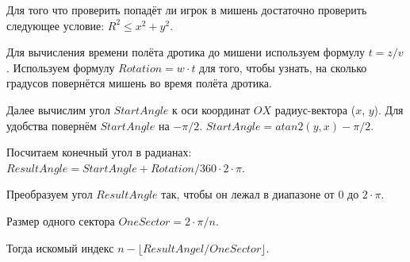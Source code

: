 \solutionSection

Для того что проверить попадёт ли игрок в мишень достаточно проверить следующее условие: $R^2 \le x^2 + y^2$.

Для вычисления времени полёта дротика до мишени используем формулу $t = z / v$. Используем формулу $Rotation = w \cdot t$ для того, чтобы узнать, на сколько градусов повернётся мишень во время полёта дротика.

Далее вычислим угол $StartAngle$ к оси координат $OX$  радиус-вектора ($x$, $y$). Для удобства повернём $StartAngle$ на $-\pi/2$. $StartAngle = atan2(y, x) - \pi/2$.

Посчитаем конечный угол в радианах: $ResultAngle = StartAngle + Rotation / 360 \cdot 2 \cdot \pi$.

Преобразуем угол $ResultAngle$ так, чтобы он лежал в диапазоне от $0$ до $2 \cdot \pi$.

Размер одного сектора $OneSector = 2 \cdot \pi / n$.

Тогда искомый индекс $n - \lfloor ResultAngel / OneSector \rfloor$. 

\codeExample

